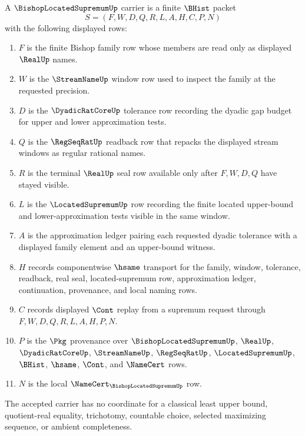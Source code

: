 \begin{definition}
\label{def:bishop-located-supremum-carrier}
A $\BishopLocatedSupremumUp$ carrier is a finite $\BHist$ packet
$$
S=(F,W,D,Q,R,L,A,H,C,P,N)
$$
with the following displayed rows:
\begin{enumerate}
\item $F$ is the finite Bishop family row whose members are read only as displayed $\RealUp$ names.
\item $W$ is the $\StreamNameUp$ window row used to inspect the family at the requested precision.
\item $D$ is the $\DyadicRatCoreUp$ tolerance row recording the dyadic gap budget for upper and lower approximation tests.
\item $Q$ is the $\RegSeqRatUp$ readback row that repacks the displayed stream windows as regular rational names.
\item $R$ is the terminal $\RealUp$ seal row available only after $F,W,D,Q$ have stayed visible.
\item $L$ is the $\LocatedSupremumUp$ row recording the finite located upper-bound and lower-approximation tests visible in the same window.
\item $A$ is the approximation ledger pairing each requested dyadic tolerance with a displayed family element and an upper-bound witness.
\item $H$ records componentwise $\hsame$ transport for the family, window, tolerance, readback, real seal, located-supremum row, approximation ledger, continuation, provenance, and local naming rows.
\item $C$ records displayed $\Cont$ replay from a supremum request through $F,W,D,Q,R,L,A,H,P,N$.
\item $P$ is the $\Pkg$ provenance over $\BishopLocatedSupremumUp$, $\RealUp$, $\DyadicRatCoreUp$, $\StreamNameUp$, $\RegSeqRatUp$, $\LocatedSupremumUp$, $\BHist$, $\hsame$, $\Cont$, and $\NameCert$ rows.
\item $N$ is the local $\NameCert_{\BishopLocatedSupremumUp}$ row.
\end{enumerate}
The accepted carrier has no coordinate for a classical least upper bound, quotient-real equality, trichotomy, countable choice, selected maximizing sequence, or ambient completeness.
\end{definition}

